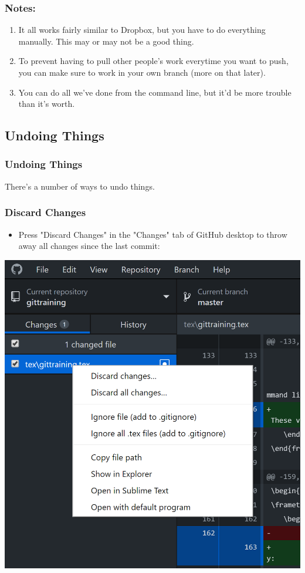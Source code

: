 \documentclass{beamer}
\begin{document}
\begin{frame}
	\frametitle{Notes:}
	\begin{enumerate}
		\item It all works fairly similar to Dropbox, but you have to do everything manually. This may or may not be a good thing.
		\item To prevent having to pull other people's work everytime you want to push, you can make sure to work in your own branch (more on that later).
		\item You can do all we've done from the command line, but it'd be more trouble than it's worth.
	\end{enumerate}
\end{frame}

\subsection{Undoing Things}

\begin{frame}
\frametitle{Undoing Things}
There's a number of ways to undo things.
\end{frame}

\begin{frame}
	\frametitle{Discard Changes}
	\begin{itemize}
		\item Press "Discard Changes" in the "Changes" tab of GitHub desktop to throw away all changes since the last commit:
	\end{itemize}
	\hfill\includegraphics[width=0.6\linewidth]{figures/DiscardChanges.png}\hfill\strut


\end{frame}
\end{document}
